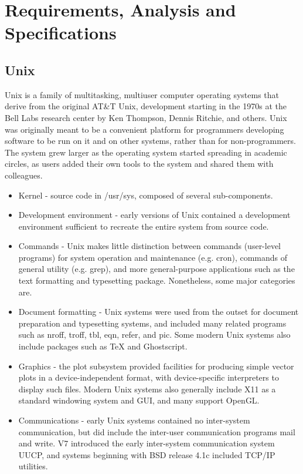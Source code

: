 \chapter{Requirements, Analysis and Specifications}
\section{Unix}
Unix is a family of multitasking, multiuser computer operating systems that derive from the original AT\&T Unix, development starting in the 1970s at the Bell Labs research center by Ken Thompson, Dennis Ritchie, and others.
Unix was originally meant to be a convenient platform for programmers developing software to be run on it and on other systems, rather than for non-programmers. The system grew larger as the operating system started spreading in academic circles, as users added their own tools to the system and shared them with colleagues.
\begin{itemize}
	\item Kernel - source code in /usr/sys, composed of several sub-components.
	\item Development environment - early versions of Unix contained a development environment sufficient to recreate the entire system from source code.
	\item Commands - Unix makes little distinction between commands (user-level programs) for system operation and maintenance (e.g. cron), commands of general utility (e.g. grep), and more general-purpose applications such as the text formatting and typesetting package. Nonetheless, some major categories are.
	\item Document formatting - Unix systems were used from the outset for document preparation and typesetting systems, and included many related programs such as nroff, troff, tbl, eqn, refer, and pic. Some modern Unix systems also include packages such as TeX and Ghostscript.
	\item Graphics - the plot subsystem provided facilities for producing simple vector plots in a device-independent format, with device-specific interpreters to display such files. Modern Unix systems also generally include X11 as a standard windowing system and GUI, and many support OpenGL.
	\item Communications - early Unix systems contained no inter-system communication, but did include the inter-user communication programs mail and write. V7 introduced the early inter-system communication system UUCP, and systems beginning with BSD release 4.1c included TCP/IP utilities.
\end{itemize}
